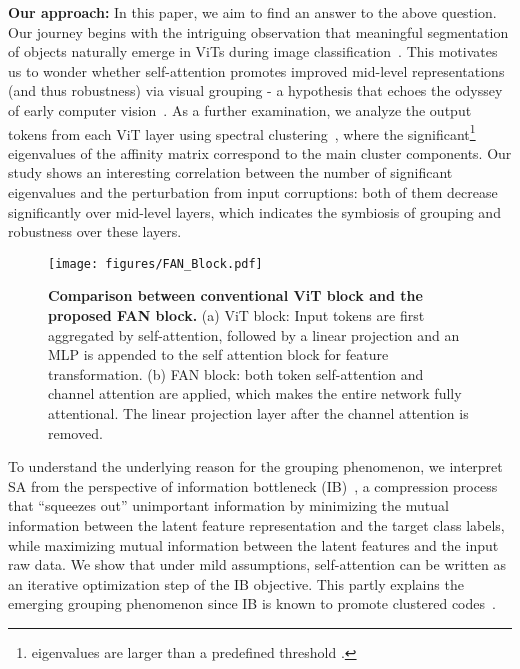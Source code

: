 \documentclass[nohyperref]{article}
\theoremstyle{plain}
\theoremstyle{definition}
\theoremstyle{remark}
\begin{document}
\textbf{Our approach:} In this paper, we aim to find an answer to the above question. Our journey begins with the intriguing observation that meaningful segmentation of objects naturally emerge in ViTs during image classification~\cite{caron2021emerging}. This motivates us to wonder whether self-attention promotes improved mid-level representations (and thus robustness) via visual grouping - a hypothesis that echoes the odyssey of early computer vision~\cite{grouping}. As a further examination, we analyze the output tokens from each ViT layer using spectral clustering~\cite{ng2002spectral}, where the significant\footnote{eigenvalues are larger than a predefined threshold .} eigenvalues of the affinity matrix correspond to the main cluster components. Our study shows an interesting correlation between the number of significant eigenvalues and the perturbation from input corruptions: both of them decrease significantly over mid-level layers, which indicates the symbiosis of grouping and robustness over these layers.

\begin{figure}[t] 
\centering
\texttt{[image: figures/FAN\_Block.pdf]}
\caption{\textbf{Comparison between conventional ViT block and the proposed FAN block.} (a) ViT block: Input tokens are first aggregated by self-attention, followed by a linear projection and an MLP is appended to the self attention block for feature transformation. (b) FAN block: both token self-attention and channel attention are applied, which makes the entire network fully attentional. The linear projection layer after the channel attention is removed.
}
\vspace{-7mm}
\label{fig:fan_arch}
\end{figure}

To understand the underlying reason for the grouping phenomenon, we interpret SA from the perspective of information bottleneck (IB)~\cite{tishby2000information,tishby2015deep}, a compression process that ``squeezes out'' unimportant information by minimizing the mutual information between the latent feature representation and the target class labels, while maximizing mutual information between the latent features and the input raw data. We show that under mild assumptions, self-attention can be written as an iterative optimization step of the IB objective. This partly explains the emerging grouping phenomenon since IB is known to promote clustered codes~\cite{still2003geometric}.
\end{document}
